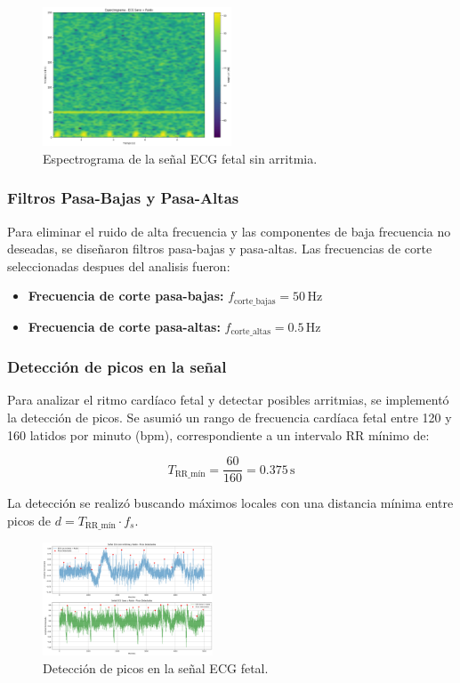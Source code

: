 \documentclass[10pt, conference]{IEEEtran}
\begin{document}
\begin{figure}[htbp]
	\centerline{\includegraphics[width=0.5\textwidth]{Espectrograma ECG Sano + Ruido.png}}
	\caption{Espectrograma de la señal ECG fetal sin arritmia.}
	\label{fig:espectrograma_sin_arritmia}
\end{figure}

\subsubsection{Filtros Pasa-Bajas y Pasa-Altas}

Para eliminar el ruido de alta frecuencia y las componentes de baja frecuencia no deseadas, se diseñaron filtros pasa-bajas y pasa-altas. Las frecuencias de corte seleccionadas despues del analisis fueron:

\begin{itemize}
	\item \textbf{Frecuencia de corte pasa-bajas:} \( f_{\text{corte\_bajas}} = 50 \, \text{Hz} \)
	\item \textbf{Frecuencia de corte pasa-altas:} \( f_{\text{corte\_altas}} = 0.5 \, \text{Hz} \)
\end{itemize}


\subsubsection{Detección de picos en la señal}
Para analizar el ritmo cardíaco fetal y detectar posibles arritmias, se implementó la detección de picos. Se asumió un rango de frecuencia cardíaca fetal entre 120 y 160 latidos por minuto (bpm), correspondiente a un intervalo RR mínimo de:

\[
T_{\text{RR\_mín}} = \frac{60}{160} = 0.375 \, \text{s}
\]

La detección se realizó buscando máximos locales con una distancia mínima entre picos de \( d = T_{\text{RR\_mín}} \cdot f_s \).

\begin{figure}[htbp]
	\centerline{\includegraphics[width=0.45\textwidth]{picos.png}}
	\caption{Detección de picos en la señal ECG fetal.}
	\label{fig:peak_detection}
\end{figure}
\end{document}

